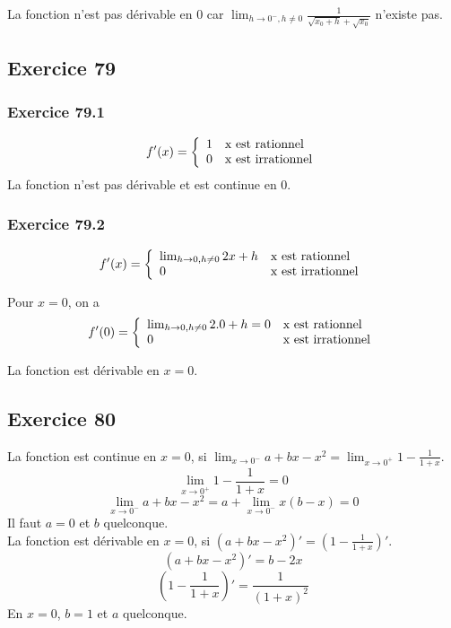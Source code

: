 \documentclass[]{book}
\theoremstyle{definition}
\begin{document}
La fonction n'est pas d\'erivable en 0 car $\lim_{h \to 0^{-}, h \neq 0} \frac{1}{\sqrt{x_0+h}+\sqrt{x_0}}$ n'existe pas.\\


\subsection*{Exercice 79}
\subsubsection*{Exercice 79.1}
$$f'(x) = 
\left\{ 
\begin{array}{l l}
1 & \textrm{x est rationnel}\\
0 & \textrm{x est irrationnel}\\
\end{array}
\right. 
$$
La fonction n'est pas d\'erivable et est continue en 0.

\subsubsection*{Exercice 79.2}
$$f'(x) = 
\left\{ 
\begin{array}{l l}
\lim_{h \to 0, h \neq 0} 2x+h & \textrm{x est rationnel}\\
0 & \textrm{x est irrationnel}\\
\end{array}
\right. 
$$

Pour $x=0$, on a 
$$f'(0) = 
\left\{ 
\begin{array}{l l}
\lim_{h \to 0, h \neq 0} 2.0+h = 0 & \textrm{x est rationnel}\\
0 & \textrm{x est irrationnel}\\
\end{array}
\right. 
$$

La fonction est d\'erivable en $x=0$.


\subsection*{Exercice 80}
La fonction est continue en $x=0$, si $\lim_{x \to 0^{-}} a + bx -x^2 = \lim_{x \to 0^{+}} 1 - \frac{1}{1+x}$.
$$\lim_{x \to 0^{+}} 1 - \frac{1}{1+x} = 0$$
$$\lim_{x \to 0^{-}} a + bx -x^2 = a + \lim_{x \to 0^{-}} x(b-x) = 0$$
Il faut $a=0$ et $b$ quelconque.\\

La fonction est d\'erivable en $x=0$, si $(a + bx -x^2)' = \left(1 - \frac{1}{1+x}\right)'$.
$$(a + bx -x^2)' = b-2x$$
$$\left(1 - \frac{1}{1+x}\right)' = \frac{1}{(1+x)^2}$$
En $x=0$, $b=1$ et $a$ quelconque.
\end{document}
